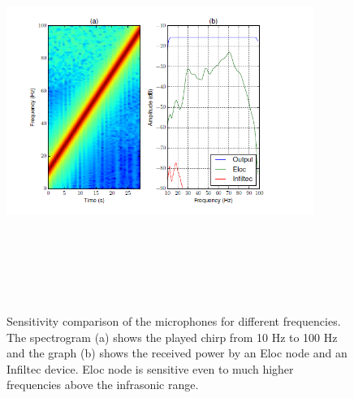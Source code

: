 \documentclass[12pt]{article}
\numberwithin{figure}{section}
\numberwithin{table}{section}
\begin{document}
\begin{figure}[H]
\centering
\includegraphics[width=10cm,height=13cm,keepaspectratio]{eloc_vs_infiltec.png}
\caption[Sensitivity comparison of the microphones]{Sensitivity comparison of the microphones for different
frequencies. The spectrogram (a) shows the played
chirp from 10 Hz to 100 Hz and the graph (b) shows the received
power by an Eloc node and an Infiltec device. Eloc
node is sensitive even to much higher frequencies above the
infrasonic range.}
\label{infiltec:eloc}
\end{figure}
\end{document}
